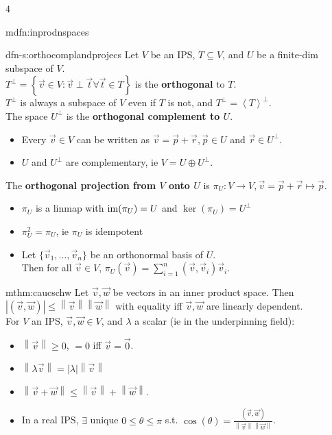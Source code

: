 \documentclass[landscape, 8pt]{extarticle}
\begin{document}
\begin{multicols*}{4}
\begin{mdfn}{mdfn:inprodnspaces}{ }
		\end{mdfn}
		
		
		\begin{dfn-s}{dfn-s:orthocomplandprojecs}{ }
			Let $V$ be an IPS, $T \subseteq V$, and $U$ be a finite-dim subspace of $V$. \\
			$T^\perp = \left\{\vec{v} \in V : \vec{v} \perp \vec{t} \forall \vec{t} \in T\right\}$ is the \textbf{orthogonal} to $T$. \\
			$T^\perp$ is always a subspace of $V$ even if $T$ is not, and $T^\perp = \left\langle T\right\rangle^\perp.$ \\
			The space $U^\perp$ is the \textbf{orthogonal complement to $U$}. 
			\begin{itemize}
				\item Every $\vec{v} \in V$ can be written as $\vec{v} = \vec{p} + \vec{r}, \vec{p} \in U$ and $\vec{r} \in U^\perp$.
				\item $U$ and $U^\perp$ are complementary, ie $V = U \oplus U^\perp$.
			\end{itemize}
			The \textbf{orthogonal projection from $V$ onto $U$} is $\pi_U : V \to V, \vec{v} = \vec{p} + \vec{r} \mapsto \vec{p}$.
			\begin{itemize}
				\item $\pi_U$ is a linmap with $\operatorname{im}(\pi_U) = U$ and $\ker (\pi_U) = U^\perp$
				\item $\pi^2_U = \pi_U$, ie $\pi_U$ is idempotent
				\item Let $\{\vec{v}_1, \dots, \vec{v}_n\}$ be an orthonormal basis of $U$. \\
				Then for all $\vec{v} \in V$, $\pi_U(\vec{v}) = \sum_{i=1}^{n}(\vec{v}, \vec{v}_i)\vec{v}_i$.
			\end{itemize}
			
		\end{dfn-s}
		
		
		\begin{mthm}{mthm:caucschw}{ }
			Let $\vec{v}, \vec{w}$ be vectors in an inner product space. Then $\left|(\vec{v}, \vec{w})\right| \le \left\lVert \vec{v}\right\rVert \left\lVert \vec{w}\right\rVert$ with equality iff $\vec{v}, \vec{w}$ are linearly dependent.\\
			For $V$ an IPS, $\vec{v}, \vec{w} \in V$, and $\lambda$ a scalar (ie in the underpinning field):
			\begin{itemize}
				\item $\left\lVert \vec{v}\right\rVert \ge 0$, $=0$ iff $\vec{v} = \vec{0}$.
				\item $\left\lVert \lambda\vec{v}\right\rVert = \left|\lambda\right| \left\lVert \vec{v}\right\rVert$
				\item $\left\lVert \vec{v} + \vec{w}\right\rVert \le \left\lVert \vec{v}\right\rVert + \left\lVert \vec{w}\right\rVert$.
				\item In a real IPS, $\exists$ unique $0 \le \theta \le \pi$ s.t. $\cos(\theta) = \frac{(\vec{v}, \vec{w})}{\left\lVert \vec{v}\right\rVert \left\lVert \vec{w}\right\rVert}$.
			\end{itemize}
			

\end{mthm}
\end{multicols*}
\end{document}
